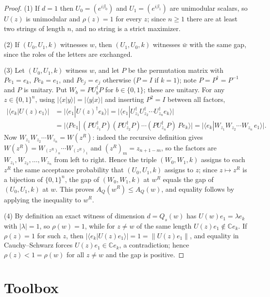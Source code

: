 \documentclass[11pt]{amsart}
\theoremstyle{definition}
\theoremstyle{remark}
\newcommand{\C}{\mathbb{C}}
\newcommand{\AQ}{A_Q}
\begin{document}
\begin{proof}
(1) If $d=1$ then $U_0=(e^{i\beta_0})$ and $U_1=(e^{i\beta_1})$ are
unimodular scalars, so $U(z)$ is unimodular and $\rho(z)=1$ for every
$z$; since $n\ge1$ there are at least two strings of length $n$, and
no string is a strict maximizer.

(2) If $(U_0,U_1,k)$ witnesses $w$, then $(U_1,U_0,k)$ witnesses
$\bar w$ with the same gap, since the roles of the letters are
exchanged.

(3) Let $(U_0,U_1,k)$ witness $w$, and let $P$ be the permutation
matrix with $Pe_1=e_k$, $Pe_k=e_1$, and $Pe_j=e_j$ otherwise ($P=I$ if
$k=1$); note $P=P^\dagger=P^{-1}$ and $P$ is unitary. Put
$W_b=PU_b^\dagger P$ for $b\in\{0,1\}$; these are unitary. For any
$z\in\{0,1\}^n$, using $|\langle x|y\rangle|=|\langle y|x\rangle|$ and
inserting $P^2=I$ between all factors,
\begin{align*}
  \bigl|\langle e_k|U(z)e_1\rangle\bigr|
  &=\bigl|\langle e_1|U(z)^\dagger e_k\rangle\bigr|
   =\bigl|\langle e_1|U_{z_1}^\dagger U_{z_2}^\dagger\cdots
     U_{z_n}^\dagger e_k\rangle\bigr|\\
  &=\bigl|\langle Pe_1|\,(PU_{z_1}^\dagger P)(PU_{z_2}^\dagger P)\cdots
     (PU_{z_n}^\dagger P)\,Pe_k\rangle\bigr|
   =\bigl|\langle e_k|W_{z_1}W_{z_2}\cdots W_{z_n}\,e_1\rangle\bigr| .
\end{align*}
Now $W_{z_1}W_{z_2}\cdots W_{z_n}=W(z^R)$: indeed the recursive
definition gives
$W(z^R)=W_{(z^R)_n}\cdots W_{(z^R)_1}$ and $(z^R)_m=z_{n+1-m}$, so the
factors are $W_{z_1},W_{z_2},\dots,W_{z_n}$ from left to right. Hence
the triple $(W_0,W_1,k)$ assigns to each $z^R$ the same acceptance
probability that $(U_0,U_1,k)$ assigns to $z$; since $z\mapsto z^R$ is
a bijection of $\{0,1\}^n$, the gap of $(W_0,W_1,k)$ at $w^R$ equals
the gap of $(U_0,U_1,k)$ at $w$. This proves $\AQ(w^R)\le\AQ(w)$, and
equality follows by applying the inequality to $w^R$.

(4) By definition an exact witness of dimension $d=Q_s(w)$ has
$U(w)e_1=\lambda e_k$ with $|\lambda|=1$, so $\rho(w)=1$, while for
$z\ne w$ of the same length $U(z)e_1\notin\C e_k$. If $\rho(z)=1$ for
such $z$, then $|\langle e_k|U(z)e_1\rangle|=1=\|U(z)e_1\|$, and
equality in Cauchy--Schwarz forces $U(z)e_1\in\C e_k$, a
contradiction; hence $\rho(z)<1=\rho(w)$ for all $z\ne w$ and the gap
is positive.
\end{proof}

\section{Toolbox}\label{sec:toolbox}
\end{document}

